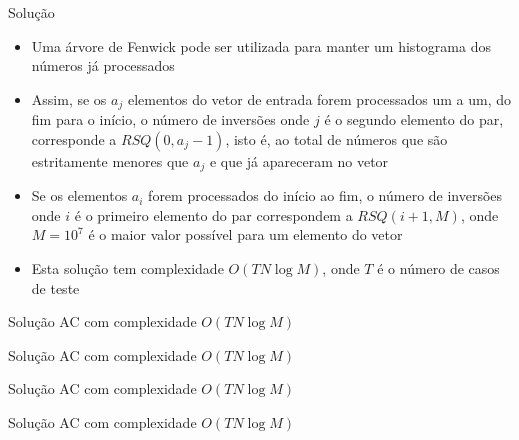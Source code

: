 \begin{frame}[fragile]{Solução}

    \begin{itemize}
        \item Uma árvore de Fenwick pode ser utilizada para manter um histograma dos
            números já processados

        \item Assim, se os $a_j$ elementos do vetor de entrada forem processados um a um, do fim
            para o início, o número de inversões onde $j$ é o segundo elemento do par, 
            corresponde a $RSQ(0, a_j - 1)$, isto é, ao total de números que são estritamente
            menores que $a_j$ e que já apareceram no vetor

        \item Se os elementos $a_i$ forem processados do início ao fim, o número de inversões onde
            $i$ é o primeiro elemento do par correspondem a $RSQ(i + 1, M)$, onde $M = 10^7$
            é o maior valor possível para um elemento do vetor

        \item Esta solução tem complexidade $O(TN\log M)$, onde $T$ é o número de casos de teste

   \end{itemize}

\end{frame}

\begin{frame}[fragile]{Solução AC com complexidade $O(TN\log M)$}
\end{frame}

\begin{frame}[fragile]{Solução AC com complexidade $O(TN\log M)$}
\end{frame}

\begin{frame}[fragile]{Solução AC com complexidade $O(TN\log M)$}
\end{frame}

\begin{frame}[fragile]{Solução AC com complexidade $O(TN\log M)$}
\end{frame}
